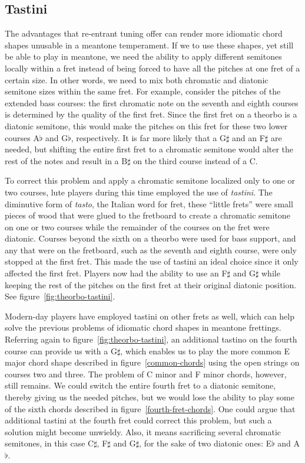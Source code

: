 \subsection{Tastini}

The advantages that re-entrant tuning offer can render more idiomatic chord
shapes unusable in a meantone temperament.  If we to use these shapes, yet still
be able to play in meantone, we need the ability to apply different semitones
locally within a fret instead of being forced to have all the pitches at one
fret of a certain size. In other words, we need to mix both chromatic and
diatonic semitone sizes within the same fret.  For example, consider the pitches
of the extended bass courses: the first chromatic note on the seventh and eighth
courses is determined by the quality of the first fret.  Since the first fret on
a theorbo is a diatonic semitone, this would make the pitches on this fret for
these two lower courses A$\flat$ and G$\flat$, respectively.  It is far more
likely that a G$\sharp$ and an F$\sharp$ are needed, but shifting the entire
first fret to a chromatic semitone would alter the rest of the notes and result
in a B$\sharp$ on the third course instead of a C.

To correct this problem and apply a chromatic semitone localized only to one or two
courses, lute players during this time employed the use of \textit{tastini}.  The
diminutive form of \textit{tasto}, the Italian word for fret, these ``little frets'' were
small pieces of wood that were glued to the fretboard to create a chromatic semitone on
one or two courses while the remainder of the courses on the fret were diatonic.  Courses
beyond the sixth on a theorbo were used for bass support, and any that were on the
fretboard, such as the seventh and eighth course, were only stopped at the first fret.
This made the use of tastini an ideal choice since it only affected the first fret. Players now had
the ability to use an F$\sharp$ and G$\sharp$ while keeping the rest of the pitches on the
first fret at their original diatonic position. See figure~\ref{fig:theorbo-tastini}.



Modern-day players have employed tastini on other frets as well, which
can help solve the previous problems of idiomatic chord shapes in meantone frettings.
Referring again to figure~\ref{fig:theorbo-tastini}, an additional tastino on the
fourth course can provide us with a G$\sharp$, which enables us to play the more
common E major chord shape described in figure~\ref{common-chords} using the open
strings on courses two and three.  The problem of C minor and F minor chords, however,
still remains.  We could switch the entire fourth fret to a diatonic semitone, thereby giving
us the needed pitches, but we would lose the ability to play some of the
sixth chords described in figure~\ref{fourth-fret-chords}.  One could argue
that additional tastini at the fourth fret could correct this problem, but such a solution
might become unwieldy.  Also, it means sacrificing several chromatic
semitones, in this case C$\sharp$, F$\sharp$ and G$\sharp$, for the sake of two diatonic
ones: E$\flat$ and A$\flat$.


